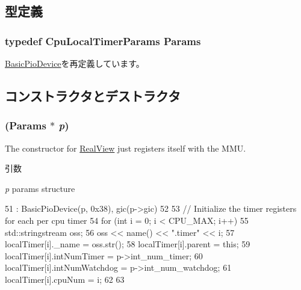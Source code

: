 \subsection{型定義}
\hypertarget{classCpuLocalTimer_a2abacbbb646e91ed1ef591d6ce81f4e3}{
\subsubsection[{Params}]{\setlength{\rightskip}{0pt plus 5cm}typedef CpuLocalTimerParams {\bf Params}}}
\label{classCpuLocalTimer_a2abacbbb646e91ed1ef591d6ce81f4e3}


\hyperlink{classBasicPioDevice_a2845515ac6467f10540747053c8a0449}{BasicPioDevice}を再定義しています。

\subsection{コンストラクタとデストラクタ}
\hypertarget{classCpuLocalTimer_ae7c3cd295b79e672e3294e726eb27f61}{
\subsubsection[{CpuLocalTimer}]{ ({\bf Params} $\ast$ {\em p})}}
\label{classCpuLocalTimer_ae7c3cd295b79e672e3294e726eb27f61}
The constructor for \hyperlink{classRealView}{RealView} just registers itself with the MMU. 
\begin{DoxyParams}{引数}
\item[{\em p}]params structure \end{DoxyParams}



\begin{DoxyCode}
51     : BasicPioDevice(p, 0x38), gic(p->gic)
52 {
53    // Initialize the timer registers for each per cpu timer
54    for (int i = 0; i < CPU_MAX; i++) {
55         std::stringstream oss;
56         oss << name() << ".timer" << i;
57         localTimer[i]._name = oss.str();
58         localTimer[i].parent = this;
59         localTimer[i].intNumTimer = p->int_num_timer;
60         localTimer[i].intNumWatchdog = p->int_num_watchdog;
61         localTimer[i].cpuNum = i;
62     }
63 }
\end{DoxyCode}


